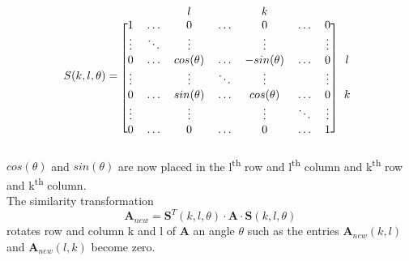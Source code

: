 \documentclass[%
oneside,                 %
final,                   %
10pt]{article}
\begin{document}
\[
S(k,l,\theta) = \begin{blockarray}{cccccccc}
 		&  				& l				&			&k 				& 			&  \\
\begin{block}{[ccccccc] c}
  1 	& \ldots 		&  0			&  \ldots	&  0			& \ldots	& 0 	&	 \\
  \vdots & \ddots 		& 	\vdots		& 	 		& 	\vdots		& 			& \vdots &  	 \\
  	0	& 	\ldots		& cos(\theta) 	& \ldots 	& -sin(\theta)	& 	\ldots	& 0		& l	 \\
  \vdots&  				& \vdots 		& \ddots 	& \vdots		& 			&\vdots&	 \\
    0	& 	 \ldots		& sin(\theta)	& \ldots	& cos(\theta) 	& 	\ldots	&	0	& k	\\
  \vdots &  			& \vdots		& 			& 	\vdots		& \ddots	& \vdots & 	\\
  0 & \ldots			& 0	 			& \ldots	& 0				& \ldots	& 1 &  	\\
\end{block}
\end{blockarray}
 \]
$cos(\theta)$ and $sin(\theta)$ are now placed in the l\textsuperscript{th} row and l\textsuperscript{th} column and k\textsuperscript{th} row and k\textsuperscript{th} column. \\
The similarity transformation 
\begin{equation}
\mathbf{A}_{new} = \mathbf{S}^T(k,l,\theta) \cdot \mathbf{A} \cdot \mathbf{S}(k,l,\theta)
\end{equation}
rotates row and column k and l of $\mathbf{A}$ an angle $\theta$ such as the entries $\mathbf{A}_  {new}(k,l)$ and $ \mathbf{A}_{new}(l,k)$ become zero.
\end{document}
